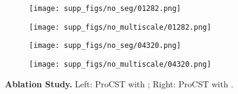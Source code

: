 \documentclass[letterpaper]{article} \usepackage[]{aaai23}  \usepackage{times}  \usepackage{helvet}  \usepackage{courier}  \usepackage[hyphens]{url}  \usepackage{graphicx} \urlstyle{rm} \def\UrlFont{\rm}  \usepackage{natbib}  \usepackage{caption} \frenchspacing  \setlength{\pdfpagewidth}{8.5in} \setlength{\pdfpageheight}{11in} \usepackage{algorithm}
\begin{document}
\begin{figure*}
    \centering
    \begin{subfigure}{0.49\linewidth}
        \centering
        \texttt{[image: supp\_figs/no\_seg/01282.png]}
    \end{subfigure}
    \begin{subfigure}{0.49\linewidth}
        \centering
        \texttt{[image: supp\_figs/no\_multiscale/01282.png]}
    \end{subfigure}
    
    \begin{subfigure}{0.49\linewidth}
        \centering
        \texttt{[image: supp\_figs/no\_seg/04320.png]}
    \end{subfigure}
    \begin{subfigure}{0.49\linewidth}
        \centering
        \texttt{[image: supp\_figs/no\_multiscale/04320.png]}
    \end{subfigure}
    \caption{\textbf{Ablation Study.} Left: ProCST with ; Right: ProCST with .}
    \label{no_seg_vs_no_ms}
\end{figure*}
\end{document}
